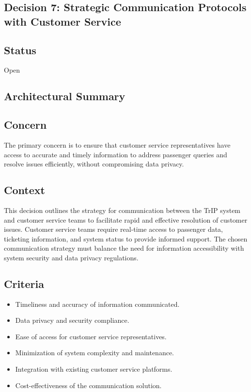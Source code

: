 \subsection{Decision 7: Strategic Communication Protocols with Customer Service}

\subsection*{Status}
Open

\subsection*{Architectural Summary}

\subsection*{Concern}
The primary concern is to ensure that customer service representatives have access to accurate and timely information to address passenger queries and resolve issues efficiently, without compromising data privacy.

\subsection*{Context}
This decision outlines the strategy for communication between the TrIP system and customer service teams to facilitate rapid and effective resolution of customer issues.
Customer service teams require real-time access to passenger data, ticketing information, and system status to provide informed support. The chosen communication strategy must balance the need for information accessibility with system security and data privacy regulations.

\subsection*{Criteria}
\begin{itemize}
    \item Timeliness and accuracy of information communicated.
    \item Data privacy and security compliance.
    \item Ease of access for customer service representatives.
    \item Minimization of system complexity and maintenance.
    \item Integration with existing customer service platforms.
    \item Cost-effectiveness of the communication solution.
\end{itemize}

